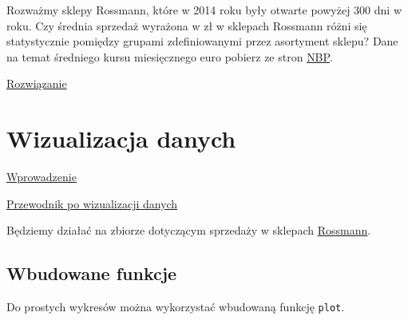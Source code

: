 \documentclass[]{book}
\newenvironment{Shaded}{\begin{snugshade}}{\end{snugshade}}
\newcommand{\KeywordTok}[1]{\textcolor[rgb]{0.13,0.29,0.53}{\textbf{#1}}}
\newcommand{\DataTypeTok}[1]{\textcolor[rgb]{0.13,0.29,0.53}{#1}}
\newcommand{\DecValTok}[1]{\textcolor[rgb]{0.00,0.00,0.81}{#1}}
\newcommand{\StringTok}[1]{\textcolor[rgb]{0.31,0.60,0.02}{#1}}
\newcommand{\OperatorTok}[1]{\textcolor[rgb]{0.81,0.36,0.00}{\textbf{#1}}}
\newcommand{\NormalTok}[1]{#1}
\begin{document}
Rozważmy sklepy Rossmann, które w 2014 roku były otwarte powyżej 300 dni
w roku. Czy średnia sprzedaż wyrażona w zł w sklepach Rossmann różni się
statystycznie pomiędzy grupami zdefiniowanymi przez asortyment sklepu?
Dane na temat średniego kursu miesięcznego euro pobierz ze stron
\href{http://www.nbp.pl/home.aspx?f=/kursy/arch_a.html}{NBP}.

\href{nb/rossmann_analiza.Rmd}{Rozwiązanie}

\chapter{Wizualizacja danych}\label{wizualizacja-danych}

\href{presentations/ggplot2.html}{Wprowadzenie}

\href{https://www.data-to-viz.com/}{Przewodnik po wizualizacji danych}

Będziemy działać na zbiorze dotyczącym sprzedaży w sklepach
\href{data/rossmann.xlsx}{Rossmann}.

\begin{Shaded}
\end{Shaded}

\section{Wbudowane funkcje}\label{wbudowane-funkcje}

Do prostych wykresów można wykorzystać wbudowaną funkcję \texttt{plot}.

\begin{Shaded}
\end{Shaded}
\end{document}
